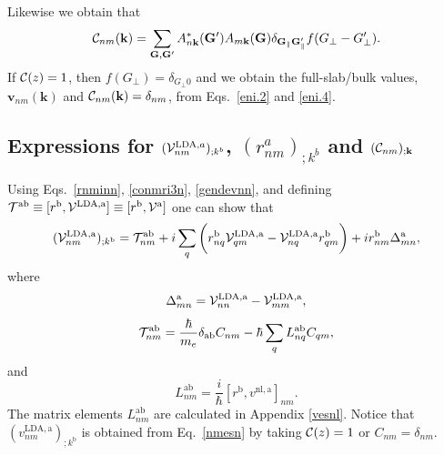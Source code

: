 \documentclass[floatfix,prb,aps,superscriptaddress,showpacs,letterpaper]{revtex4}
\begin{document}
Likewise we obtain that
\begin{equation}
{\mathbf{\cal C}}_{nm}(\mathbf{k})=
\sum_{\mathbf{G},\mathbf{G}'} A^*_{n\mathbf{k}}(\mathbf{G}')  A_{m\mathbf{k}}(\mathbf{G})
\delta_{\mathbf{G}_\parallel \mathbf{G}'_\parallel} 
f(G_\perp-G'_\perp)
.
\label{eni.4}
\end{equation}  
If ${\mathbf{\cal C}}(z)=1$, then $f(G_\perp)=\delta_{G_\perp 0}$ and we 
obtain the full-slab/bulk values, 
$\mathbf{v}_{nm}(\mathbf{k})$ and ${\mathbf{\cal C}}_{nm}(\mathbf{k})=\delta_{nm}$,
from Eqs.~\eqref{eni.2} and \eqref{eni.4}.

\subsection{Expressions for 
\texorpdfstring{$({\mathbf{\cal V}}^{\mathrm{LDA},a}_{nm})_{;k^b}$}{Vnonlocal},
\texorpdfstring{$(r^a_{nm})_{;k^b}$}{Vnonlocal}
and \texorpdfstring{$({\mathbf{\cal C}}_{nm})_{;\mathbf{k}}$}{Vnonlocal}
}\label{appvnl}

Using Eqs.~\eqref{rnminn}, \eqref{conmri3n}, \eqref{gendevnn}, and
defining 
$
{\cal T}^{\mathrm{a}\mathrm{b}}\equiv[r^{\mathrm{b}},{\mathbf{\cal V}}^{\mathrm{LDA},\mathrm{a}}]
\equiv
[r^{\mathrm{b}},{\mathbf{\cal V}}^\mathrm{a}]
$
one can show that
\begin{equation}
({\mathbf{\cal V}}^{\mathrm{LDA},\mathrm{a}}_{nm})_{;k^{\mathrm{b}}}=
{\cal T}_{nm}^{\mathrm{a}\mathrm{b}}
+i
\sum_{q}
\bigg(
r^{\mathrm{b}}_{nq}  
{\mathbf{\cal V}}^{\mathrm{LDA},\mathrm{a}}_{q m}
-
{\mathbf{\cal V}}^{\mathrm{LDA},\mathrm{a}}_{nq}   
r^{\mathrm{b}}_{q m}
\bigg)  
+i  
r^{\mathrm{b}}_{nm}
\Delta^{\mathrm{a}}_{mn}
,
\label{nmesn}
\end{equation}
where
\begin{equation*}
\Delta^{\mathrm{a}}_{mn}
=
{\mathbf{\cal V}}^{\mathrm{LDA},\mathrm{a}}_{nn}  
-
{\mathbf{\cal V}}^{\mathrm{LDA},\mathrm{a}}_{mm}  
,
\end{equation*} 
\begin{equation}
{\cal T}_{nm}^{\mathrm{a}\mathrm{b}}
=
\frac{\hbar}{m_e}\delta_{\mathrm{a}\mathrm{b}} 
C_{nm} 
-\hbar 
\sum_q  
L^{\mathrm{a}\mathrm{b}}_{nq} 
C_{qm} 
,
\label{tau.1}
\end{equation}   
and
\begin{equation}
L_{nm}^{\mathrm{a}\mathrm{b}}
=\frac{i}{\hbar}[r^{\mathrm{b}},v^{\mathrm{nl},\mathrm{a}}]_{nm}
.
\label{lab}
\end{equation}  
The matrix elements $L^{\mathrm{a}\mathrm{b}}_{nm}$
are calculated in Appendix \ref{vesnl}.
Notice that
$(v^{\mathrm{LDA},\mathrm{a}}_{nm})_{;k^{\mathrm{b}}}$ is obtained 
from Eq.~\eqref{nmesn} by 
taking 
${\mathbf{\cal C}}(z)=1$ or $C_{nm}=\delta_{nm}$.
\end{document}
